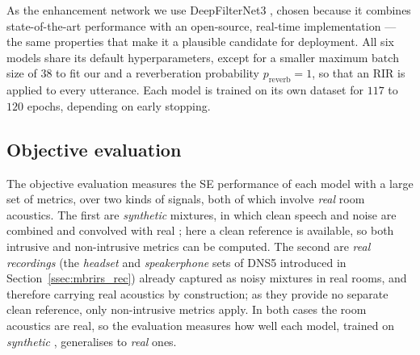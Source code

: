 As the enhancement network we use DeepFilterNet3 \citep{schroter2023deepfilternet3},
chosen because it combines state-of-the-art performance with an open-source,
real-time implementation --- the same properties that make it a plausible
candidate for deployment. All six models share its default hyperparameters,
except for a smaller maximum batch size of $38$ to fit our  and
a reverberation probability $p_{\text{reverb}} = 1$, so that an \acrshort{RIR} is
applied to every utterance. Each model is trained on its own dataset for $117$
to $120$ epochs, depending on early stopping.


\subsection{Objective evaluation}
\label{ssec:mbrirs_objective}

The objective evaluation measures the \acrshort{SE} performance of each model
with a large set of metrics, over two kinds of signals, both
of which involve \emph{real} room acoustics. The first are \emph{synthetic}
mixtures, in which clean speech and noise are combined and convolved with real
; here a clean reference is available, so both intrusive and
non-intrusive metrics can be computed. The second are \emph{real recordings} (the \emph{headset} and \emph{speakerphone} sets of \acrshort{DNS}5 introduced in
Section~\ref{ssec:mbrirs_rec}) already captured as noisy mixtures in real
rooms, and therefore carrying real acoustics by construction; as they provide no
separate clean reference, only non-intrusive metrics apply. In both cases the
room acoustics are real, so the evaluation measures how well each model, trained
on \emph{synthetic} , generalises to \emph{real} ones.

